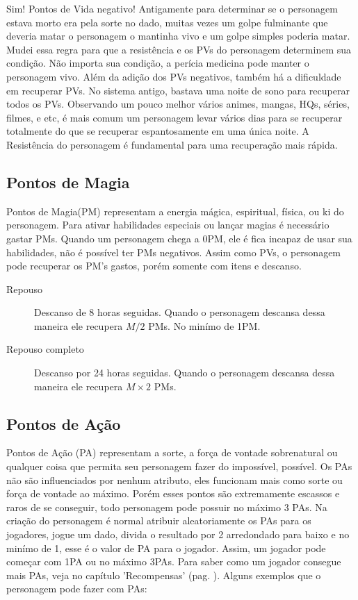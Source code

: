 \begin{framed}
Sim! Pontos de Vida negativo! Antigamente para determinar se o personagem estava morto era pela sorte no dado, muitas vezes um golpe fulminante que deveria matar o personagem o mantinha vivo e um golpe simples poderia matar. Mudei essa regra para que a resistência e os PVs do personagem determinem sua condição. Não importa sua condição, a perícia medicina pode manter o personagem vivo.
Além da adição dos PVs negativos, também há a dificuldade em recuperar PVs. No sistema antigo, bastava uma noite de sono para recuperar todos os PVs. Observando um pouco melhor vários animes, mangas, HQs, séries, filmes, e etc, é mais comum um personagem levar vários dias para se recuperar totalmente do que se recuperar espantosamente em uma única noite. A Resistência do personagem é fundamental para uma recuperação mais rápida.  
\end{framed}

\subsection{Pontos de Magia}

Pontos de Magia(PM) representam a energia mágica, espiritual, física, ou ki do personagem. Para ativar habilidades especiais ou lançar magias é necessário gastar PMs. Quando um personagem chega a 0PM, ele é fica incapaz de usar sua habilidades, não é possível ter PMs negativos. Assim como PVs, o personagem pode recuperar os PM's gastos, porém somente com itens e descanso.

\begin{description}
\item[Repouso] Descanso de 8 horas seguidas. Quando o personagem descansa dessa maneira ele recupera \( M/2 \) PMs. No minímo de 1PM.
\item[Repouso completo] Descanso por 24 horas seguidas. Quando o personagem descansa dessa maneira ele recupera \( M \times 2 \) PMs.
\end{description}


\subsection{Pontos de Ação}

Pontos de Ação (PA) representam a sorte, a força de vontade sobrenatural ou qualquer coisa que permita seu personagem fazer do impossível, possível. Os PAs não são influenciados por nenhum atributo, eles funcionam mais como sorte ou força de vontade ao máximo. Porém esses pontos são extremamente escassos e raros de se conseguir, todo personagem pode possuir no máximo 3 PAs. Na criação do personagem é normal atribuir aleatoriamente os PAs para os jogadores, jogue um dado, divida o resultado por 2 arredondado para baixo e no minímo de 1, esse é o valor de PA para o jogador. Assim, um jogador pode começar com 1PA ou no máximo 3PAs. Para saber como um jogador consegue mais PAs, veja no capítulo 'Recompensas' (pag. \pageref{ch:rewards}). Alguns exemplos que o personagem pode fazer com PAs:

